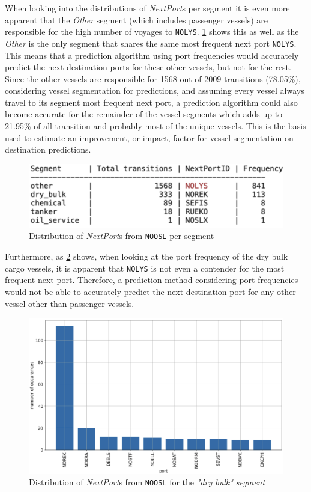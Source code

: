 When looking into the distributions of \textit{NextPort}s per segment it is even more apparent that the \textit{Other} segment (which includes passenger vessels) are responsible for the high number of voyages to \texttt{NOLYS}. \cref{fig:apw_noosl_segments} shows this as well as the \textit{Other} is the only segment that shares the same most frequent next port \texttt{NOLYS}. This means that a prediction algorithm using port frequencies would accurately predict the next destination ports for these other vessels, but not for the rest. Since the other vessels are responsible for 1568 out of 2009 transitions (78.05\%), considering vessel segmentation for predictions, and assuming every vessel always travel to its segment most frequent next port, a prediction algorithm could also become accurate for the remainder of the vessel segments which adds up to 21.95\% of all transition and probably most of the unique vessels. This is the basis used to estimate an improvement, or impact, factor for vessel segmentation on destination predictions.

\begin{figure}[htbp]
    \centering
    \includegraphics[width=.7\textwidth]{figures/apw/noosl_segments.png}
    \caption{Distribution of \textit{NextPort}s from \texttt{NOOSL} per segment}
    \label{fig:apw_noosl_segments}
\end{figure}

Furthermore, as \cref{fig:apw_noosl_dry_bulk} shows, when looking at the port frequency of the dry bulk cargo vessels, it is apparent that \texttt{NOLYS} is not even a contender for the most frequent next port. Therefore, a prediction method considering port frequencies would not be able to accurately predict the next destination port for any other vessel other than passenger vessels.

\begin{figure}[htbp]
    \centering
    \includegraphics[width=.9\textwidth]{figures/apw/noosl_dry_bulk.png}
    \caption{Distribution of \textit{NextPort}s from \texttt{NOOSL} for the \textit{"dry bulk" segment}}
    \label{fig:apw_noosl_dry_bulk}
\end{figure}

